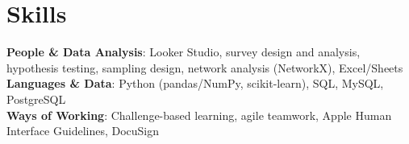 \documentclass[a4paper,11pt]{article}
\begin{document}
\section{\textbf{Skills}}
 \begin{itemize}[leftmargin=0.05in, label={}]
    \small{\item{
     \textbf{People \& Data Analysis}{: Looker Studio, survey design and analysis, hypothesis testing, sampling design, network analysis (NetworkX), Excel/Sheets} \\
     \textbf{Languages \& Data}{: Python (pandas/NumPy, scikit-learn), SQL, MySQL, PostgreSQL} \\
     \textbf{Ways of Working}{: Challenge-based learning, agile teamwork, Apple Human Interface Guidelines, DocuSign} \\
    }}
 \end{itemize}
 \vspace{-16pt}
\end{document}
